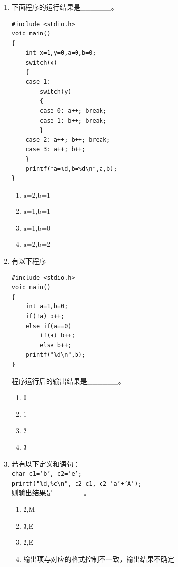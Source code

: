 \documentclass[a4paper,12pt]{article}
\begin{document}
\begin{enumerate}
	\item 下面程序的运行结果是\_\_\_\_\_\_。
	      \begin{verbatim}
#include <stdio.h>
void main()
{
    int x=1,y=0,a=0,b=0;
    switch(x)
    {
    case 1:
        switch(y)
        {
        case 0: a++; break;
        case 1: b++; break;
        }
    case 2: a++; b++; break;
    case 3: a++; b++;
    }
    printf("a=%d,b=%d\n",a,b);
}
    \end{verbatim}
	      \begin{enumerate}
		      \item[A)] a=2,b=1
		      \item[B)] a=1,b=1
		      \item[C)] a=1,b=0
		      \item[D)] a=2,b=2
	      \end{enumerate}
	      \vspace{0.3cm}

	\item 有以下程序
	      \begin{verbatim}
#include <stdio.h>
void main()
{
    int a=1,b=0;
    if(!a) b++;
    else if(a==0)
        if(a) b++;
        else b++;
    printf("%d\n",b);
}
    \end{verbatim}
	      程序运行后的输出结果是\_\_\_\_\_\_。
	      \begin{enumerate}
		      \item[A)] 0
		      \item[B)] 1
		      \item[C)] 2
		      \item[D)] 3
	      \end{enumerate}
	      \vspace{0.3cm}

	\item 若有以下定义和语句：\\
	      \texttt{char c1='b', c2='e';}\\
	      \texttt{printf("\%d,\%c\textbackslash n", c2-c1, c2-'a'+'A');}\\
	      则输出结果是\_\_\_\_\_\_。
	      \begin{enumerate}
		      \item[A)] 2,M
		      \item[B)] 3,E
		      \item[C)] 2,E
		      \item[D)] 输出项与对应的格式控制不一致，输出结果不确定
	      \end{enumerate}
	      \vspace{0.3cm}


\end{enumerate}
\end{document}
